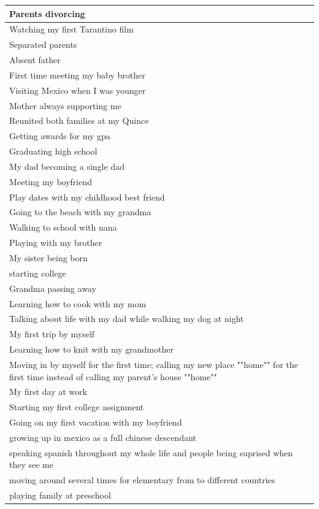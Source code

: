 \documentclass[
  .7em,
  letterpaper,
  DIV=11,
  numbers=noendperiod]{scrartcl}
\begin{document}
\begin{table}
\begin{tabular}{l}
\hline
Parents divorcing\\
\hline
Watching my first Tarantino film\\
\hline
Separated parents\\
\hline
Absent father\\
\hline
First time meeting my baby brother\\
\hline
Visiting Mexico when I was younger\\
\hline
Mother always supporting me\\
\hline
Reunited both families at my Quince\\
\hline
Getting awards for my gpa\\
\hline
Graduating high school\\
\hline
My dad becoming a single dad\\
\hline
Meeting my boyfriend\\
\hline
Play dates with my childhood best friend\\
\hline
Going to the beach with my grandma\\
\hline
Walking to school with nana\\
\hline
Playing with my brother\\
\hline
My sister being born\\
\hline
starting college\\
\hline
Grandma passing away\\
\hline
Learning how to cook with my mom\\
\hline
Talking about life with my dad while walking my dog at night\\
\hline
My first trip by myself\\
\hline
Learning how to knit with my grandmother\\
\hline
Moving in by myself for the first time; calling my new place ""home"" for the first time instead of calling my parent's house ""home""\\
\hline
My first day at work\\
\hline
Starting my first college assignment\\
\hline
Going on my first vacation with my boyfriend\\
\hline
growing up in mexico as a full chinese descendant\\
\hline
speaking spanish throughout my whole life and people being suprised when they see me\\
\hline
moving around several times for elementary from to different countries\\
\hline
playing family at preschool\\

\end{tabular}
\end{table}
\end{document}
